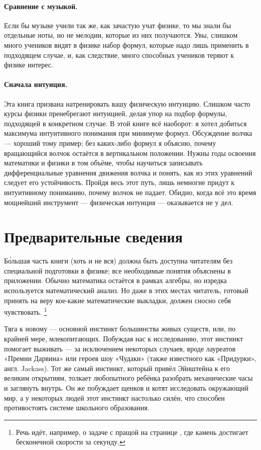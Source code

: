 \paragraph{Сравнение с музыкой.}
Если бы музыке учили так же, как зачастую учат физике, то мы знали бы отдельные ноты, но не мелодии, которые из них получаются.
Увы, слишком много учеников видят в физике набор формул, которые надо лишь применить в подходящем случае, и,
как следствие, много способных учеников теряют к физике интерес.

\paragraph{Сначала интуиция.}
Эта книга призвана натренировать вашу физическую интуицию.
Слишком часто курсы физики пренебрегают интуицией, делая упор на подбор формулы, подходящей в конкретном случае.
В этой книге всё наоборот:
я хотел добиться максимума интуитивного понимания при минимуме формул.
Обсуждение волчка --- хороший тому пример;
без каких-либо формул я объясню, почему вращающийся волчок остаётся в вертикальном положении.
Нужны годы освоения математики и физики в том объёме, чтобы научиться записывать дифференциальные уравнения движения волчка и понять, как из этих уравнений следует его устойчивость.
Пройдя весь этот путь, лишь немногие придут к интуитивному пониманию, почему волчок не падает.
Обидно, когда всё это время мощнейший инструмент --- физическая интуиция --- оказывается не у дел.

\section{Предварительные сведения}

Б\'{о}льшая часть книги (хоть и не вся) должна быть доступна читателям без специальной подготовки в физике;
все необходимые понятия объяснены в приложении.
Обычно математика остаётся в рамках алгебры, но изредка используется математический анализ.
Но даже в этих местах читатель, готовый принять на веру кое-какие математические выкладки, должен сносно себя чувствовать.%
\footnote{Речь идёт, например, о задаче с пращой на странице \pageref{???}, где камень достигает бесконечной скорости за секунду.}

Тяга к новому — основной инстинкт большинства живых существ, или, по крайней мере, млекопитающих.
Побуждая нас к исследованию, этот инстинкт помогает выживать — за исключением некоторых случаев, вроде лауреатов «Премии Дарвина» или героев шоу «Чудаки» (также известного как «Придурки», англ. Jackass).
Тот же самый инстинкт, который привёл Эйнштейна к его великим открытиям, толкает любопытного ребёнка разобрать механические часы и заглянуть внутрь.
Он же побуждает щенков и котят исследовать окружающий мир,
а у некоторых людей этот инстинкт настолько силён, что способен противостоять системе школьного образования.

